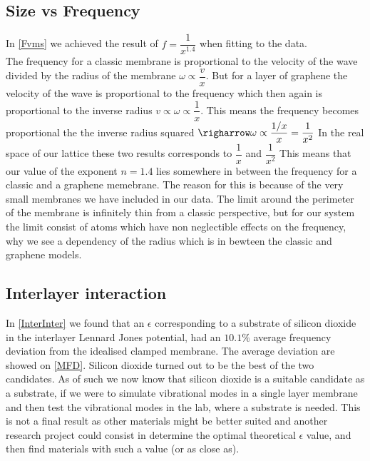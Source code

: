 \subsection{Size vs Frequency}
In \cref{Fvms} we achieved the result of $f=\dfrac{1}{x^{1.4}}$ when fitting to the data. \\
The frequency for a classic membrane is proportional to the velocity of the wave divided by the radius of the membrane $\omega \propto \dfrac{v}{x}$. But for a layer of graphene the velocity of the wave is proportional to the frequency which then again is proportional to the inverse radius $v\propto\omega\propto\dfrac{1}{x}$. This means the frequency becomes proportional the the inverse radius squared $\righarrow \omega \propto \dfrac{1/x}{x}=\dfrac{1}{x^{2}}$ In the real space of our lattice these two results corresponds to $\dfrac{1}{x}$ and $\dfrac{1}{x^{2}}$ This means that our value of the exponent $n=1.4$ lies somewhere in between the frequency for a classic and a graphene memebrane. The reason for this is because of the very small membranes we have included in our data. The limit around the perimeter of the membrane is infinitely thin from a classic perspective, but for our system the limit consist of atoms which have non neglectible effects on the frequency, why we see a dependency of the radius which is in bewteen the classic and graphene models. 
\subsection{Interlayer interaction}
In \cref{InterInter} we found that an $\epsilon$ corresponding to a substrate of silicon dioxide in the interlayer Lennard Jones potential, had an $10.1\%$ average frequency deviation from the idealised clamped membrane. The average deviation are showed on \cref{MFD}. Silicon dioxide turned out to be the best of the two candidates. As of such we now know that silicon dioxide is a suitable candidate as a substrate, if we were to simulate vibrational modes in a single layer membrane and then test the vibrational modes in the lab, where a substrate is needed. This is not a final result as other materials might be better suited and another research project could consist in determine the optimal theoretical $\epsilon$ value, and then find materials with such a value (or as close as).

